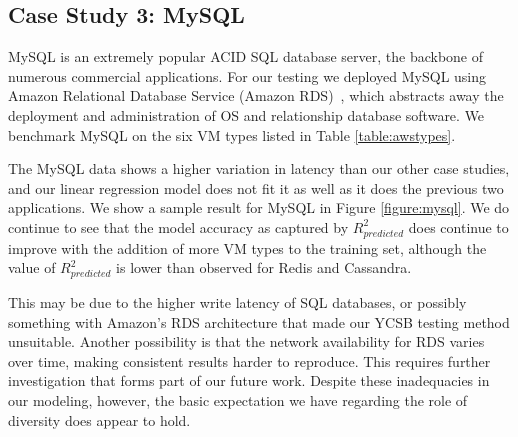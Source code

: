 \subsection{Case Study 3: MySQL}
\vspace{10pt}


MySQL is an extremely popular ACID SQL database server, the backbone of numerous commercial applications.  For our testing we deployed MySQL %
using Amazon Relational Database Service (Amazon RDS)~\cite{amazon-rds}, which abstracts away the deployment and administration of OS and relationship database software.  We benchmark MySQL %
on the six VM types listed in Table \ref{table:awstypes}.  %

The MySQL data shows a higher variation in latency than our other case studies, and our linear regression model does not fit it as well as it does the previous two applications. %
We show a sample %
result for MySQL in Figure \ref{figure:mysql}. We do continue to see that the model accuracy as captured by $R^2_{predicted}$ does continue to improve with the addition of more VM types to the training set, although the value of $R^2_{predicted}$ is lower than observed for Redis and Cassandra. 

This may be due to the higher write latency of SQL databases, or possibly something with Amazon's RDS architecture that made our YCSB testing method unsuitable.  Another possibility is that the network availability for RDS varies over time, making consistent results harder to reproduce. This requires further investigation that forms part of our future work. Despite these inadequacies in our modeling, however, the basic expectation we have regarding the role of diversity does appear to hold. 

